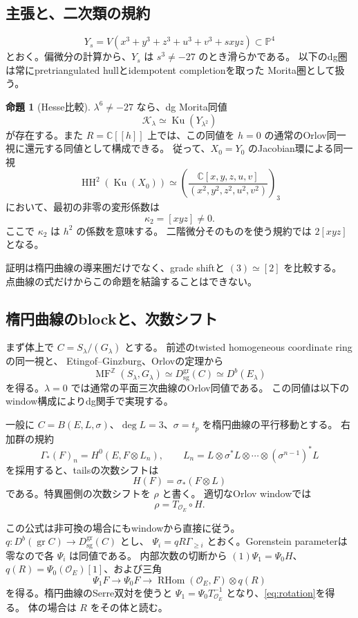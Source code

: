 \documentclass[a4paper,11pt]{ltjsarticle}
\theoremstyle{definition}
\newtheorem{theorem}{命題}[section]
\newcommand{\CC}{\mathbb C}
\newcommand{\OO}{\mathcal O}
\newcommand{\PP}{\mathbb P}
\newcommand{\Ku}{\operatorname{Ku}}
\newcommand{\HH}{\operatorname{HH}}
\newcommand{\Dsg}{D_{\mathrm{sg}}}
\newcommand{\RHom}{\operatorname{RHom}}
\newcommand{\MF}{\operatorname{MF}}
\begin{document}
\subsection{主張と、二次類の規約}

\[
 Y_s=V(x^3+y^3+z^3+u^3+v^3+sxyz)\subset\PP^4
\]
とおく。偏微分の計算から、$Y_s$ は $s^3\ne-27$ のとき滑らかである。
以下のdg圏は常にpretriangulated hullとidempotent completionを取った
Morita圏として扱う。

\begin{theorem}[Hesse比較]\label{thm:hesse}
$\lambda^6\ne-27$ なら、dg Morita同値
\[
 \mathcal K_\lambda\simeq\Ku(Y_{\lambda^2})
\]
が存在する。また $R=\CC[[h]]$ 上では、この同値を
$h=0$ の通常のOrlov同一視に還元する同値として構成できる。
従って、$X_0=Y_0$ のJacobian環による同一視
\[
 \HH^2(\Ku(X_0))\simeq
 \left(\frac{\CC[x,y,z,u,v]}{(x^2,y^2,z^2,u^2,v^2)}\right)_3
\]
において、最初の非零の変形係数は
\[
 \boxed{\kappa_2=[xyz]\ne0.}
\]
ここで $\kappa_2$ は $h^2$ の係数を意味する。
二階微分そのものを使う規約では $2[xyz]$ となる。
\end{theorem}

証明は楕円曲線の導来圏だけでなく、grade shiftと $(3)\simeq[2]$ を比較する。
点曲線の式だけからこの命題を結論することはできない。

\subsection{楕円曲線のblockと、次数シフト}

まず体上で $C=S_\lambda/(G_\lambda)$ とする。
前述のtwisted homogeneous coordinate ringの同一視と、
Etingof--Ginzburg\cite[Theorem 3.6.2]{EG}、Orlovの定理から
\[
 \MF^{\mathbb Z}(S_\lambda,G_\lambda)
 \simeq\Dsg^{\mathrm{gr}}(C)\simeq D^b(E_\lambda)
\]
を得る。$\lambda=0$ では通常の平面三次曲線のOrlov同値である。
この同値は以下のwindow構成によりdg関手で実現する。

一般に $C=B(E,L,\sigma)$、$\deg L=3$、$\sigma=t_p$ を楕円曲線の平行移動とする。
右加群の規約
\[
 \Gamma_*(F)_n=H^0(E,F\otimes L_n),\qquad
 L_n=L\otimes\sigma^*L\otimes\cdots\otimes(\sigma^{n-1})^*L
\]
を採用すると、tailsの次数シフトは
\[
 H(F)=\sigma_*(F\otimes L)
\]
である。特異圏側の次数シフトを $\rho$ と書く。
適切なOrlov windowでは
\begin{equation}\label{eq:rotation}
 \rho=T_{\OO_E}\circ H.
\end{equation}

この公式は非可換の場合にもwindowから直接に従う。
$q:D^b(\operatorname{gr}C)\to\Dsg^{\mathrm{gr}}(C)$ とし、
$\Psi_i=qR\Gamma_{\ge i}$ とおく。Gorenstein parameterは零なので各 $\Psi_i$ は同値である。
内部次数の切断から $(1)\Psi_1=\Psi_0H$、
$q(R)=\Psi_0(\OO_E)[1]$、および三角
\[
 \Psi_1F\longrightarrow\Psi_0F\longrightarrow
 \RHom(\OO_E,F)\otimes q(R)
\]
を得る。楕円曲線のSerre双対を使うと
$\Psi_1=\Psi_0T_{\OO_E}^{-1}$ となり、\eqref{eq:rotation}を得る。
体の場合は $R$ をその体と読む。
\end{document}
